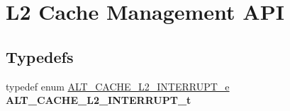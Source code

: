 \hypertarget{group__CACHE__L2}{}\section{L2 Cache Management A\+PI}
\label{group__CACHE__L2}
\subsection*{Typedefs}
\begin{DoxyCompactItemize}
\item 
\mbox{\label{group__CACHE__L2_gab7cc11181ab6e21874366afb0caddb37}} 
typedef enum \mbox{\hyperlink{group__CACHE__L2_ga84becd73f55dba868c78e0304d27ea39}{A\+L\+T\+\_\+\+C\+A\+C\+H\+E\+\_\+\+L2\+\_\+\+I\+N\+T\+E\+R\+R\+U\+P\+T\+\_\+e}} {\bfseries A\+L\+T\+\_\+\+C\+A\+C\+H\+E\+\_\+\+L2\+\_\+\+I\+N\+T\+E\+R\+R\+U\+P\+T\+\_\+t}
\end{DoxyCompactItemize}

